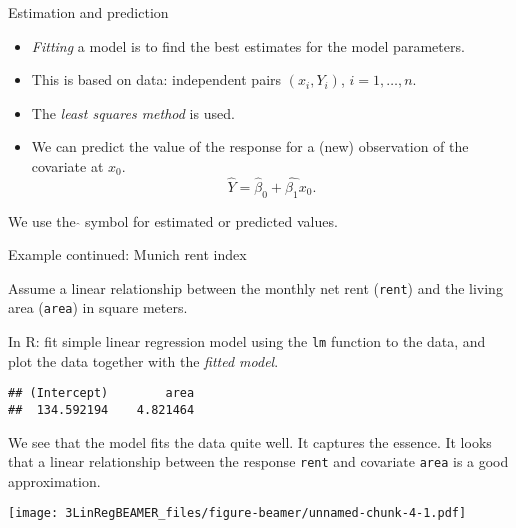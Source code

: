 \documentclass[ignorenonframetext,]{beamer}
\providecommand{\tightlist}{%
  \setlength{\itemsep}{0pt}\setlength{\parskip}{0pt}}
\begin{document}
\begin{frame}

\begin{block}{Estimation and prediction}

\begin{itemize}
\tightlist
\item
  \emph{Fitting} a model is to find the best estimates for the model
  parameters.
\item
  This is based on data: independent pairs \((x_i,Y_i)\),
  \(i=1,\ldots,n\).
\item
  The \emph{least squares method} is used.
\item
  We can predict the value of the response for a (new) observation of
  the covariate at \(x_0\).
  \[\hat{Y} = \hat{\beta}_0 + \hat{\beta_1}x_0.\]
\end{itemize}

We use the \(\hat{}\) symbol for estimated or predicted values.

\end{block}

\end{frame}

\begin{frame}[fragile]

\begin{block}{Example continued: Munich rent index}

Assume a linear relationship between the monthly net rent
(\texttt{rent}) and the living area (\texttt{area}) in square meters.

In R: fit simple linear regression model using the \texttt{lm} function
to the data, and plot the data together with the \emph{fitted model}.

\begin{verbatim}
## (Intercept)        area 
##  134.592194    4.821464
\end{verbatim}

\end{block}

\end{frame}

\begin{frame}[fragile]

We see that the model fits the data quite well. It captures the essence.
It looks that a linear relationship between the response \texttt{rent}
and covariate \texttt{area} is a good approximation.

\texttt{[image: 3LinRegBEAMER\_files/figure-beamer/unnamed-chunk-4-1.pdf]}

\end{frame}
\end{document}
